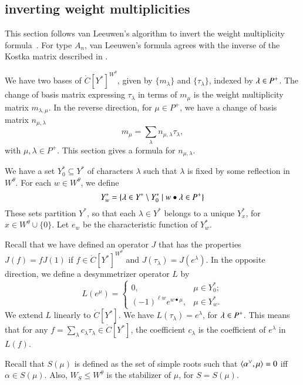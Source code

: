 \subsection{inverting weight multiplicities}

This section follows  van Leeuwen's algorithm to invert the weight multiplicity
formula~\cite{vanleeuwen}.  
For type $A_n$, van Leeuwen's formula agrees with the inverse of the Kostka
matrix described in \cite{duan}.

We have two bases of $\ring{C}[Y^*]^{W^\theta}$, given by $\{m_\lambda\}$ and $\{\tau_\lambda\}$, indexed
by $\lambda\in P^+$.  
The change of basis matrix expressing $\tau_\lambda$ in terms of $m_\mu$ is the weight multiplicity
matrix $m_{\lambda,\mu}$.  In the reverse direction, for $\mu\in P^+$,
we have a change of basis matrix $n_{\mu,\lambda}$ 
\begin{equation}\label{eqn:n}
m_\mu = \sum_{\lambda} n_{\mu,\lambda} \tau_\lambda,
\end{equation}
with $\mu,\lambda\in P^+$.
This section gives a formula for $n_{\mu,\lambda}$.  

We have a set $Y^*_0\subseteq Y^*$ of characters $\lambda$ such that $\lambda$ is fixed by some
reflection in $W^\theta$.  For each $w\in W^\theta$, we define
\[
Y^*_w = \{\lambda\in Y^*\setminus Y^*_0\mid w\bullet \lambda \in P^+\}
\]
These sets partition $Y^*$, so that each $\lambda\in Y^*$ belongs to a unique $Y^*_x$, for $x\in W^\theta\cup\{0\}$.
Let $e_w$ be the characteristic function of $Y^*_w$.

Recall that we have defined an operator
$J$ that has the properties $J(f) = f J(1)$ if $f\in \ring{C}[Y^*]^{W^\theta}$ and $J(\tau_\lambda) = J(e^\lambda)$.
In the opposite direction, we define a desymmetrizer operator $L$ by
\[
L(e^\mu) = \begin{cases}
0,& \mu\in Y^*_0;\\
(-1)^{\ell{w}} e^{w\bullet \mu},& \mu\in Y^*_w.
\end{cases}
\]
We extend $L$ linearly to $\ring{C}[Y^*]$.
We have $L(\tau_\lambda) = e^\lambda$, for $\lambda\in P^+$.  This means that
for any $f = \sum_\lambda c_\lambda \tau_\lambda \in \ring{C}[Y^*]$, the coefficient $c_\lambda$
is the coefficient of $e^\lambda$ in $L(f)$.

Recall that $S(\mu)$ is defined as the set of simple roots
such that 
$\langle{\alpha^\vee,\mu}\rangle=0$ iff $\alpha\in S(\mu)$.
%
Also, $W_S\le W^\theta$ is the stabilizer of $\mu$, for $S = S(\mu)$.

